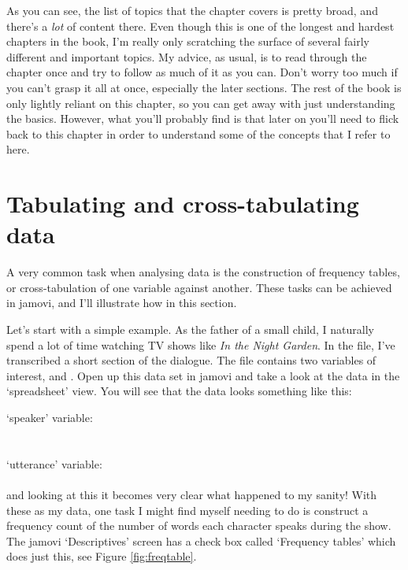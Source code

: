 As you can see, the list of topics that the chapter covers is pretty broad, and there's a {\it lot} of content there. Even though this is one of the longest and hardest chapters in the book, I'm really only scratching the surface of several fairly different and important topics. My advice, as usual, is to read through the chapter once and try to follow as much of it as you can. Don't worry too much if you can't grasp it all at once, especially the later sections. The rest of the book is only lightly reliant on this chapter, so you can get away with just understanding the basics. However, what you'll probably find is that later on you'll need to flick back to this chapter in order to understand some of the concepts that I refer to here.




\section{Tabulating and cross-tabulating data\label{sec:freqtables}}

A very common task when analysing data is the construction of frequency tables, or cross-tabulation of one variable against another. These tasks can be achieved in jamovi, and I'll illustrate how in this section. 


Let's start with a simple example. As the father of a small child, I naturally spend a lot of time watching TV shows like {\it In the Night Garden}. In the  file, I've transcribed a short section of the dialogue. The file contains two variables of interest,  and . Open up this data set in jamovi and take a look at the data in the `spreadsheet' view. You will see that the data looks something like this:

\noindent
`speaker' variable: \\
 \\ \\
\noindent
`utterance' variable: \\
 \\

and looking at this it becomes very clear what happened to my sanity! With these as my data, one task I might find myself needing to do is construct a frequency count of the number of words each character speaks during the show. The jamovi `Descriptives' screen has a check box called `Frequency tables' which does just this, see Figure \ref{fig:freqtable}. \\


